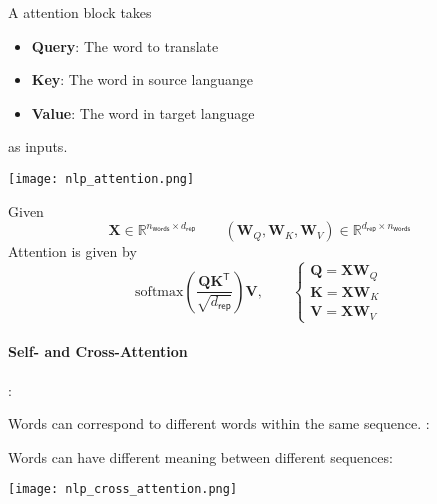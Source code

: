\newpar{}
A attention block takes
\begin{itemize}
    \item \textbf{Query}: The word to translate
    \item \textbf{Key}: The word in source languange
    \item \textbf{Value}: The word in target language
\end{itemize}
as inputs.

\newpar{}
\begin{center}
    \texttt{[image: nlp\_attention.png]}
\end{center}

\begin{examplesection}
    Given
    \noindent\begin{equation*}
        \mathbf{X}\in \mathbb{R}^{n_{\mathsf{words}} \times d_{\mathsf{rep}}}\qquad (\mathbf{W}_Q, \mathbf{W}_K, \mathbf{W}_V)\in \mathbb{R}^{d_{\mathsf{rep}}\times n_{\mathsf{words}}}
    \end{equation*}
    Attention is given by
    \noindent\begin{equation*}
        \mathrm{softmax}\left(\frac{\mathbf{QK}^{\mathsf{T}}}{\sqrt{d_{\mathsf{rep}}}}\right) \mathbf{V},\qquad
        \begin{cases}
            \mathbf{Q} = \mathbf{XW}_Q \\
            \mathbf{K} = \mathbf{XW}_K \\
            \mathbf{V} = \mathbf{XW}_V
        \end{cases}
    \end{equation*}
\end{examplesection}

\paragraph{Self- and Cross-Attention}

:

Words can correspond to different words within the same sequence.
\newpar{}
:

Words can have different meaning between different sequences:

\begin{center}
    \texttt{[image: nlp\_cross\_attention.png]}
\end{center}

